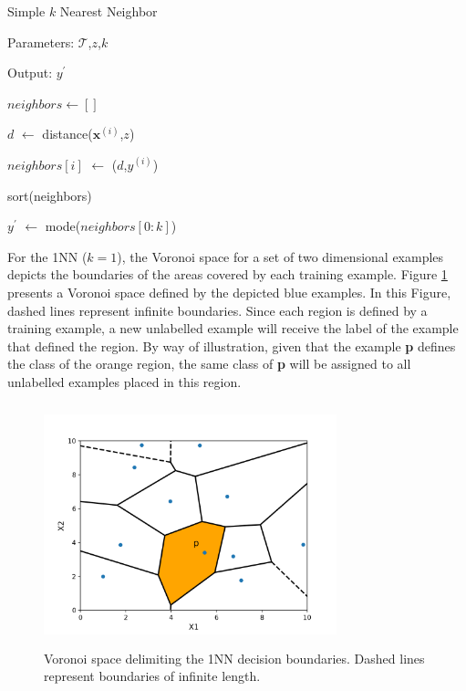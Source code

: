 \vspace{0.2cm}

\begin{algorithm}[ht!]
    \caption{Simple $k$ Nearest Neighbor}
    
    Parameters: $\mathcal{T}$,$z$,$k$
    
    Output: $y^{'}$
    
    \begin{algorithmic}[1] 
    
    \STATE $neighbors \gets []$
    
    
      \STATE $d$ $\gets$ distance($\mathbf{x}^{(i)}$,$z$)
    
      
      \STATE $neighbors[i]$ $\gets$ ($d$,$y^{(i)}$)
    
    \ENDFOR
    
    
    \STATE sort(neighbors)
    
    
    \STATE $y^{'}$ $\gets$ mode($neighbors[0:k]$)
    
    
    \end{algorithmic}


\label{alg:knn}
    
\end{algorithm}


\vspace{0.2cm}

For the 1NN ($k = 1$), the Voronoi space for a set of two dimensional examples depicts the boundaries of the areas covered by each training example. Figure \ref{fig:voronoi} presents a Voronoi space defined by the depicted blue examples. In this Figure, dashed lines represent infinite boundaries. Since each region is defined by a training example, a new unlabelled example will receive the label of the example that defined the region. By way of illustration, given that the example \textbf{p} defines the class of the orange region, the same class of \textbf{p} will be assigned to all unlabelled examples placed in this region.


\begin{figure}[h]
    \centering
    \includegraphics[height = 7cm, width =  8.5cm]{"Part 3 - Learning Systems/Supervised Learning/k-Nearest Neighbors/figures/voronoi2.png"}
    \caption{Voronoi space delimiting the 1NN decision boundaries. Dashed lines represent boundaries of infinite length.}
    \label{fig:voronoi}
\end{figure}

